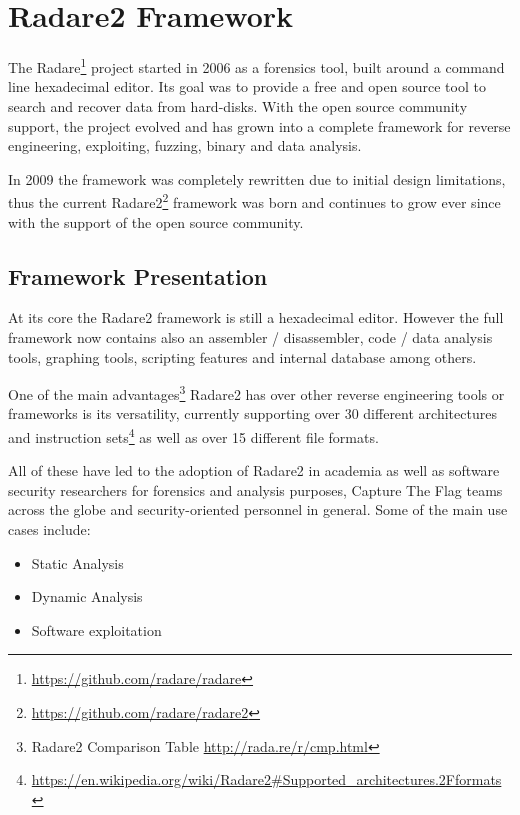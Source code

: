 \chapter{Radare2 Framework}
\label{chapter:radare}

The Radare\cite{pancake2008rbook}\cite{pancake2009radare}\footnote{\url{https://github.com/radare/radare}} project started in 2006 as a forensics tool, built around a command line hexadecimal editor. Its goal was to provide a free and open source tool to search and recover data from hard-disks. With the open source community support, the project evolved and has grown into a complete framework for reverse engineering, exploiting, fuzzing, binary and data analysis.

In 2009 the framework was completely rewritten due to initial design limitations, thus the current Radare2\cite{maijin2016r2book}\footnote{\url{https://github.com/radare/radare2}} framework was born and continues to grow ever since with the support of the open source community.

\section{Framework Presentation}
\label{sec:presentation}

At its core the Radare2 framework is still a hexadecimal editor. However the full framework now contains also an assembler / disassembler, code / data analysis tools, graphing tools, scripting features and internal database among others.

One of the main advantages\footnote{Radare2 Comparison Table \url{http://rada.re/r/cmp.html}} Radare2 has over other reverse engineering tools or frameworks is its versatility, currently supporting over 30 different architectures and instruction sets\footnote{\url{https://en.wikipedia.org/wiki/Radare2\#Supported_architectures.2Fformats}} as well as over 15 different file formats.


All of these have led to the adoption of Radare2 in academia as well as software security researchers for forensics and analysis purposes, Capture The Flag teams across the globe and security-oriented personnel in general. Some of the main use cases include:
\begin{itemize}
	\item Static Analysis
	\item Dynamic Analysis
	\item Software exploitation
\end{itemize}

